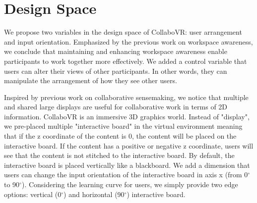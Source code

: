 \documentclass{sigchi}
\begin{document}
\section{Design Space}
We propose two variables in the design space of CollaboVR: user arrangement and input orientation. Emphasized by the previous work on workspace awareness, we conclude that maintaining and enhancing workspace awareness enable participants to work together more effectively. We added a control variable that users can alter their views of other participants. In other words, they can manipulate the arrangement of how they see other users. 

Inspired by previous work on collaborative sensemaking, we notice that multiple and shared large displays are useful for collaborative work in terms of 2D information. CollaboVR is an immersive 3D graphics world. Instead of "display", we pre-placed multiple "interactive board" in the virtual environment meaning that if the z coordinate of the content is 0, the content will be placed on the interactive board. If the content has a positive or negative z coordinate, users will see that the content is not stitched to the interactive board. By default, the interactive board is placed vertically like a blackboard. We add a dimension that users can change the input orientation of the interactive board in axis x (from 0$^{\circ}$ to 90$^{\circ}$). Considering the learning curve for users, we simply provide two edge options: vertical (0$^{\circ}$) and horizontal (90$^{\circ}$) interactive board.
\end{document}
